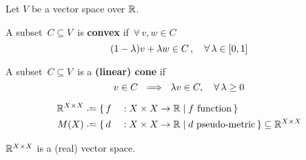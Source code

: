 \documentclass[./main.tex]{subfiles}
\begin{document}
\Hrule

Let $V$ be a vector space over $\mathbb{R}$.

\begin{definition}
    A subset $\, C \subseteq V \,$ is \textbf{convex} if $\, \forall\, v,w \in C \,$
    \[ (1-\lambda)v + \lambda w \in C \,, \quad \forall\, \lambda \in [0,1] \nospblw \]
\end{definition}

\begin{definition}
    A subset $\, C \subseteq V \,$ is a \textbf{(linear) cone} if
    \[ v \in C \ \implies\ \lambda v \in C, \quad \forall\, \lambda \geq 0 \nospblw \]
\end{definition}

\begin{notation}
    \begin{fleqn} \equp
    \begin{alignat*}{2}
        \R^\XX &\defeq \{\, f &&: \XX \to \R \mathrel{|} f\ \text{function} \,\} \\
        M(X) &\defeq \{\, d &&: \XX \to \R \mathrel{|} d\ \text{pseudo-metric} \,\} \subseteq \R^\XX
    \end{alignat*}
    \end{fleqn}
\end{notation}

\begin{fact}
    $\mathbb{R}^{X \times X}$ is a (real) vector space. 
\end{fact}
\end{document}
